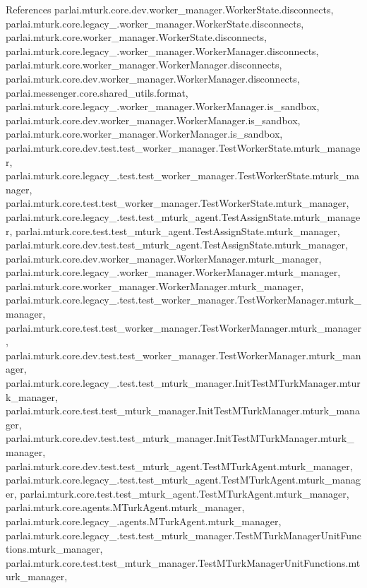 References parlai.\+mturk.\+core.\+dev.\+worker\+\_\+manager.\+Worker\+State.\+disconnects, parlai.\+mturk.\+core.\+legacy\+\_.\+worker\+\_\+manager.\+Worker\+State.\+disconnects, parlai.\+mturk.\+core.\+worker\+\_\+manager.\+Worker\+State.\+disconnects, parlai.\+mturk.\+core.\+legacy\+\_.\+worker\+\_\+manager.\+Worker\+Manager.\+disconnects, parlai.\+mturk.\+core.\+worker\+\_\+manager.\+Worker\+Manager.\+disconnects, parlai.\+mturk.\+core.\+dev.\+worker\+\_\+manager.\+Worker\+Manager.\+disconnects, parlai.\+messenger.\+core.\+shared\+\_\+utils.\+format, parlai.\+mturk.\+core.\+legacy\+\_.\+worker\+\_\+manager.\+Worker\+Manager.\+is\+\_\+sandbox, parlai.\+mturk.\+core.\+dev.\+worker\+\_\+manager.\+Worker\+Manager.\+is\+\_\+sandbox, parlai.\+mturk.\+core.\+worker\+\_\+manager.\+Worker\+Manager.\+is\+\_\+sandbox, parlai.\+mturk.\+core.\+dev.\+test.\+test\+\_\+worker\+\_\+manager.\+Test\+Worker\+State.\+mturk\+\_\+manager, parlai.\+mturk.\+core.\+legacy\+\_.\+test.\+test\+\_\+worker\+\_\+manager.\+Test\+Worker\+State.\+mturk\+\_\+manager, parlai.\+mturk.\+core.\+test.\+test\+\_\+worker\+\_\+manager.\+Test\+Worker\+State.\+mturk\+\_\+manager, parlai.\+mturk.\+core.\+legacy\+\_.\+test.\+test\+\_\+mturk\+\_\+agent.\+Test\+Assign\+State.\+mturk\+\_\+manager, parlai.\+mturk.\+core.\+test.\+test\+\_\+mturk\+\_\+agent.\+Test\+Assign\+State.\+mturk\+\_\+manager, parlai.\+mturk.\+core.\+dev.\+test.\+test\+\_\+mturk\+\_\+agent.\+Test\+Assign\+State.\+mturk\+\_\+manager, parlai.\+mturk.\+core.\+dev.\+worker\+\_\+manager.\+Worker\+Manager.\+mturk\+\_\+manager, parlai.\+mturk.\+core.\+legacy\+\_.\+worker\+\_\+manager.\+Worker\+Manager.\+mturk\+\_\+manager, parlai.\+mturk.\+core.\+worker\+\_\+manager.\+Worker\+Manager.\+mturk\+\_\+manager, parlai.\+mturk.\+core.\+legacy\+\_.\+test.\+test\+\_\+worker\+\_\+manager.\+Test\+Worker\+Manager.\+mturk\+\_\+manager, parlai.\+mturk.\+core.\+test.\+test\+\_\+worker\+\_\+manager.\+Test\+Worker\+Manager.\+mturk\+\_\+manager, parlai.\+mturk.\+core.\+dev.\+test.\+test\+\_\+worker\+\_\+manager.\+Test\+Worker\+Manager.\+mturk\+\_\+manager, parlai.\+mturk.\+core.\+legacy\+\_.\+test.\+test\+\_\+mturk\+\_\+manager.\+Init\+Test\+M\+Turk\+Manager.\+mturk\+\_\+manager, parlai.\+mturk.\+core.\+test.\+test\+\_\+mturk\+\_\+manager.\+Init\+Test\+M\+Turk\+Manager.\+mturk\+\_\+manager, parlai.\+mturk.\+core.\+dev.\+test.\+test\+\_\+mturk\+\_\+manager.\+Init\+Test\+M\+Turk\+Manager.\+mturk\+\_\+manager, parlai.\+mturk.\+core.\+dev.\+test.\+test\+\_\+mturk\+\_\+agent.\+Test\+M\+Turk\+Agent.\+mturk\+\_\+manager, parlai.\+mturk.\+core.\+legacy\+\_.\+test.\+test\+\_\+mturk\+\_\+agent.\+Test\+M\+Turk\+Agent.\+mturk\+\_\+manager, parlai.\+mturk.\+core.\+test.\+test\+\_\+mturk\+\_\+agent.\+Test\+M\+Turk\+Agent.\+mturk\+\_\+manager, parlai.\+mturk.\+core.\+agents.\+M\+Turk\+Agent.\+mturk\+\_\+manager, parlai.\+mturk.\+core.\+legacy\+\_.\+agents.\+M\+Turk\+Agent.\+mturk\+\_\+manager, parlai.\+mturk.\+core.\+legacy\+\_.\+test.\+test\+\_\+mturk\+\_\+manager.\+Test\+M\+Turk\+Manager\+Unit\+Functions.\+mturk\+\_\+manager, parlai.\+mturk.\+core.\+test.\+test\+\_\+mturk\+\_\+manager.\+Test\+M\+Turk\+Manager\+Unit\+Functions.\+mturk\+\_\+manager, 